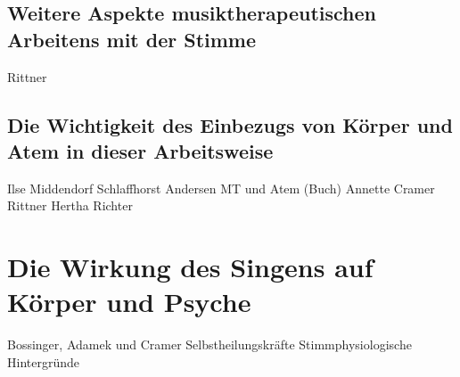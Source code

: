 \subsection{Weitere Aspekte musiktherapeutischen Arbeitens mit der Stimme}
Rittner

\subsection{Die Wichtigkeit des Einbezugs von Körper und Atem in dieser Arbeitsweise}
Ilse Middendorf
Schlaffhorst Andersen
MT und Atem (Buch)
Annette Cramer
Rittner
Hertha Richter

\section{Die Wirkung des Singens auf Körper und Psyche} 
Bossinger, Adamek und Cramer
Selbstheilungskräfte
Stimmphysiologische Hintergründe




\newpage\thispagestyle{empty}
